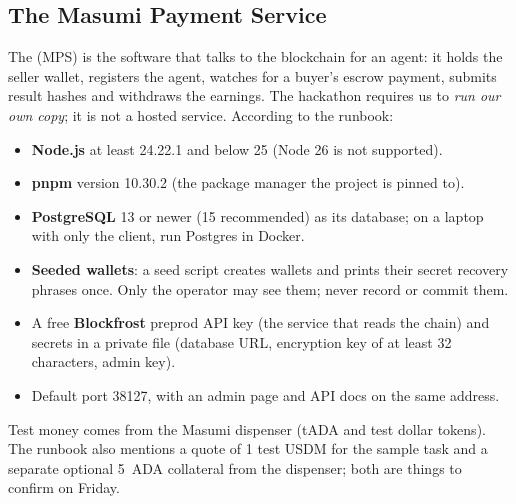 \begin{center}
\end{center}

\subsection{The Masumi Payment Service}
The  (MPS) is the software that talks to the blockchain for an agent: it holds the seller wallet, registers the agent, watches for a buyer's escrow payment, submits result hashes and withdraws the earnings. The hackathon requires us to \emph{run our own copy}; it is not a hosted service. According to the runbook:
\begin{itemize}
  \item \textbf{Node.js} at least 24.22.1 and below 25 (Node 26 is not supported).
  \item \textbf{pnpm} version 10.30.2 (the package manager the project is pinned to).
  \item \textbf{PostgreSQL} 13 or newer (15 recommended) as its database; on a laptop with only the  client, run Postgres in Docker.
  \item \textbf{Seeded wallets}: a seed script creates wallets and prints their secret recovery phrases once. Only the operator may see them; never record or commit them.
  \item A free \textbf{Blockfrost} preprod API key (the service that reads the chain) and secrets in a private  file (database URL, encryption key of at least 32 characters, admin key).
  \item Default port 38127, with an admin page and API docs on the same address.
\end{itemize}
Test money comes from the Masumi dispenser (tADA and test dollar tokens). The runbook also mentions a quote of 1 test USDM for the sample task and a separate optional 5~ADA collateral from the dispenser; both are things to confirm on Friday.

